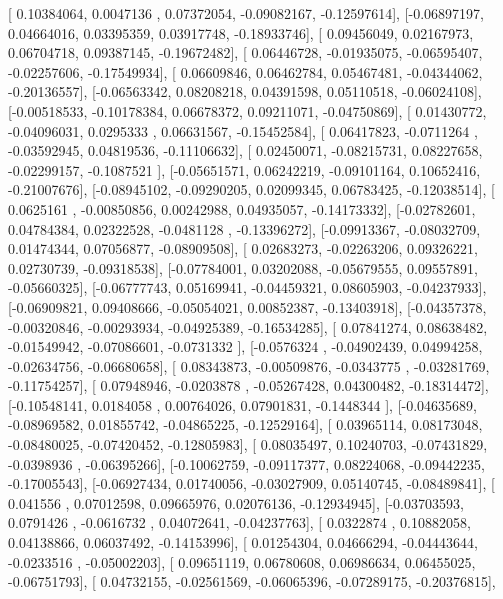 \documentclass{article}
\begin{document}
       [ 0.10384064,  0.0047136 ,  0.07372054, -0.09082167, -0.12597614],
       [-0.06897197,  0.04664016,  0.03395359,  0.03917748, -0.18933746],
       [ 0.09456049,  0.02167973,  0.06704718,  0.09387145, -0.19672482],
       [ 0.06446728, -0.01935075, -0.06595407, -0.02257606, -0.17549934],
       [ 0.06609846,  0.06462784,  0.05467481, -0.04344062, -0.20136557],
       [-0.06563342,  0.08208218,  0.04391598,  0.05110518, -0.06024108],
       [-0.00518533, -0.10178384,  0.06678372,  0.09211071, -0.04750869],
       [ 0.01430772, -0.04096031,  0.0295333 ,  0.06631567, -0.15452584],
       [ 0.06417823, -0.0711264 , -0.03592945,  0.04819536, -0.11106632],
       [ 0.02450071, -0.08215731,  0.08227658, -0.02299157, -0.1087521 ],
       [-0.05651571,  0.06242219, -0.09101164,  0.10652416, -0.21007676],
       [-0.08945102, -0.09290205,  0.02099345,  0.06783425, -0.12038514],
       [ 0.0625161 , -0.00850856,  0.00242988,  0.04935057, -0.14173332],
       [-0.02782601,  0.04784384,  0.02322528, -0.0481128 , -0.13396272],
       [-0.09913367, -0.08032709,  0.01474344,  0.07056877, -0.08909508],
       [ 0.02683273, -0.02263206,  0.09326221,  0.02730739, -0.09318538],
       [-0.07784001,  0.03202088, -0.05679555,  0.09557891, -0.05660325],
       [-0.06777743,  0.05169941, -0.04459321,  0.08605903, -0.04237933],
       [-0.06909821,  0.09408666, -0.05054021,  0.00852387, -0.13403918],
       [-0.04357378, -0.00320846, -0.00293934, -0.04925389, -0.16534285],
       [ 0.07841274,  0.08638482, -0.01549942, -0.07086601, -0.0731332 ],
       [-0.0576324 , -0.04902439,  0.04994258, -0.02634756, -0.06680658],
       [ 0.08343873, -0.00509876, -0.0343775 , -0.03281769, -0.11754257],
       [ 0.07948946, -0.0203878 , -0.05267428,  0.04300482, -0.18314472],
       [-0.10548141,  0.0184058 ,  0.00764026,  0.07901831, -0.1448344 ],
       [-0.04635689, -0.08969582,  0.01855742, -0.04865225, -0.12529164],
       [ 0.03965114,  0.08173048, -0.08480025, -0.07420452, -0.12805983],
       [ 0.08035497,  0.10240703, -0.07431829, -0.0398936 , -0.06395266],
       [-0.10062759, -0.09117377,  0.08224068, -0.09442235, -0.17005543],
       [-0.06927434,  0.01740056, -0.03027909,  0.05140745, -0.08489841],
       [ 0.041556  ,  0.07012598,  0.09665976,  0.02076136, -0.12934945],
       [-0.03703593,  0.0791426 , -0.0616732 ,  0.04072641, -0.04237763],
       [ 0.0322874 ,  0.10882058,  0.04138866,  0.06037492, -0.14153996],
       [ 0.01254304,  0.04666294, -0.04443644, -0.0233516 , -0.05002203],
       [ 0.09651119,  0.06780608,  0.06986634,  0.06455025, -0.06751793],
       [ 0.04732155, -0.02561569, -0.06065396, -0.07289175, -0.20376815],
\end{document}
